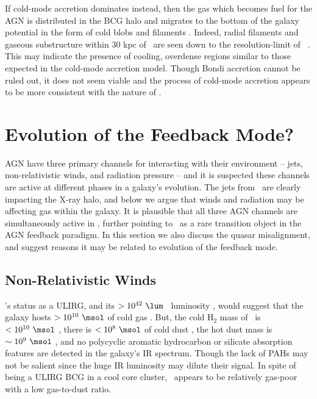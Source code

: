 \documentclass[useAMS,usenatbib]{mn2e}
\begin{document}
If cold-mode accretion \citep{pizzolato05} dominates instead, then the
gas which becomes fuel for the AGN is distributed in the BCG halo and
migrates to the bottom of the galaxy potential in the form of cold
blobs and filaments \citep{2010arXiv1003.4181P,
  2010arXiv1007.3512P}. Indeed, radial filaments and gaseous
substructure within 30 kpc of \irs\ are seen down to the
resolution-limit of \hst\ \citep{1999Ap&SS.266..113A}. This may
indicate the presence of cooling, overdense regions similar to those
expected in the cold-mode accretion model. Though Bondi accretion
cannot be ruled out, it does not seem viable \citep[which may be true
  in general, ][]{minaspin} and the process of cold-mode accretion
appears to be more consistent with the nature of \irs.

\section{Evolution of the Feedback Mode?}
\label{sec:evo}

AGN have three primary channels for interacting with their environment
-- jets, non-relativistic winds, and radiation pressure -- and it is
suspected these channels are active at different phases in a galaxy's
evolution. The jets from \irs\ are clearly impacting the X-ray halo,
and below we argue that winds and radiation may be affecting gas
within the galaxy. It is plausible that all three AGN channels are
simultaneously active in \irs, further pointing to \irs\ as a rare
transition object in the AGN feedback paradigm. In this section we
also discuss the quasar misalignment, and suggest reasons it may be
related to evolution of the feedback mode.

\subsection{Non-Relativistic Winds}

\irs's status as a ULIRG, and its $> 10^{42} ~\lum$
\halpha\ luminosity \citep{1996MNRAS.283.1003C, 1998ApJ...506..205E},
would suggest that the galaxy hosts $> 10^{10} ~\msol$ of cold gas
\citep[\eg][]{1988ApJ...325...74S, edge01}. But, the cold H$_2$ mass
of \irs\ is $< 10^{10} ~\msol$ \citep{1998ApJ...506..205E}, there is
$< 10^8 ~\msol$ of cold dust \citep{2001MNRAS.326.1467D}, the hot dust
mass is $\sim 10^9 ~\msol$ \citep{1997A&A...318L...1T}, and no
polycyclic aromatic hydrocarbon \citep{1997A&A...318L...1T,
  2008ApJ...683..114S} or silicate absorption features
\citep{2004ApJ...613..986P} are detected in the galaxy's IR
spectrum. Though the lack of PAHs may not be salient since the huge IR
luminosity may dilute their signal. In spite of being a ULIRG BCG in a
cool core cluster, \irs\ appears to be relatively gas-poor with a low
gas-to-dust ratio.
\end{document}
